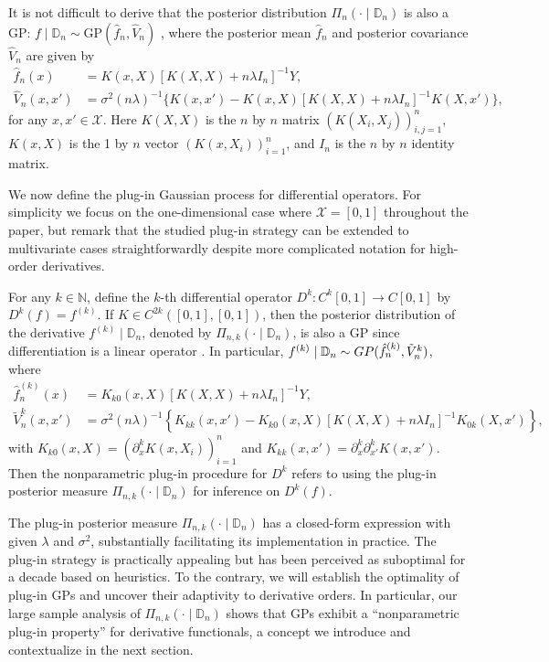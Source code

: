 \documentclass[12pt]{article}
\newcommand\data{\mathbb{D}_n}
\newcommand{\mX}{\mathcal{X}}
\newcommand{\GP}{\mathrm{GP}}
\theoremstyle{plain}
\theoremstyle{nonitalicremark}
\begin{document}
It is not difficult to derive that the posterior distribution $\Pi_n(\cdot\mid\data)$ is also a GP: $f \mid \data \sim \GP(\hat{f}_n, \hat{V}_n)$ \cite[Chapter~2.2]{rasmussen2006}, where the posterior mean $\hat{f}_n$ and posterior covariance $\hat{V}_n$ are given by
\begin{align}
\hat{f}_n(x) &= K(x, X) [K(X, X) + n \lambda I_n]^{-1} Y,\\
\label{eq:variance}\hat{V}_n(x, x') &=  \sigma^2 (n \lambda)^{-1} \{K(x, x') - K(x, X)[K(X, X) + n \lambda I_n]^{-1} K(X, x')\},
\end{align}
for any $x, x' \in \mX$. Here $K(X, X)$ is the $n$ by $n$ matrix $(K(X_i, X_j))_{i, j = 1}^n$, $K(x, X)$ is the 1 by $n$ vector $(K(x, X_i))_{i = 1}^n$, and $I_n$ is the $n$  by $n$ identity matrix. 

We now define the plug-in Gaussian process for differential operators. For simplicity we focus on the one-dimensional case where $\mX=[0,1]$ throughout the paper, but remark that the studied plug-in strategy can be extended to multivariate cases straightforwardly despite more complicated notation for high-order derivatives. 

For any $k\in\mathbb{N}$, define the $k$-th differential operator $D^k:C^k[0,1]\rightarrow C[0,1]$ by $D^k(f)=f^{(k)}$. If $K\in C^{2k}([0,1],[0,1])$, then the posterior distribution of the derivative $f^{(k)}\mid \data$, denoted by $\Pi_{n,k}(\cdot\mid\data)$, is also a GP since differentiation is a linear operator \cite[Chapters~4.1.1 and 9.4]{rasmussen2006}. In particular, $f^{(k)} \mid \data \sim {\rm GP}(\hat{f}^{(k)}_n, \tilde{V}^k_n)$, where
\begin{align}
\label{eq:f.hat.deriv}\hat{f}^{(k)}_n(x) &= K_{k0}(x, X) [K(X, X) + n \lambda I_n]^{-1} Y,\\
\label{eq:deriv.variance}\tilde{V}^k_n(x, x')&= \sigma^2 (n \lambda)^{-1} \left\{K_{kk}(x, x') -  K_{k0}(x, X)[K(X, X) + n \lambda I_n]^{-1} K_{0k}(X, x')\right\},
\end{align}
with $K_{k0}(x, X) = (\partial^k_x K(x, X_i))_{i = 1}^n$ and $K_{kk}(x, x')=\partial^{k}_x\partial^k_{x'}K(x,x')$. Then the nonparametric plug-in procedure for $D^k$ refers to using the plug-in posterior measure $\Pi_{n,k}(\cdot\mid\data)$ for inference on $D^k(f)$. 

The plug-in posterior measure $\Pi_{n,k}(\cdot\mid\data)$ has a closed-form expression with given $\lambda$ and $\sigma^2$, substantially facilitating its implementation in practice. The plug-in strategy is practically appealing but has been perceived as suboptimal for a decade \citep{stein2012interpolation,holsclaw2013gaussian} based on heuristics. To the contrary, we will establish the optimality of plug-in GPs and uncover their adaptivity to derivative orders. In particular, our large sample analysis of $\Pi_{n,k}(\cdot\mid\data)$ shows that GPs exhibit a ``nonparametric plug-in property'' for derivative functionals, a concept we introduce and contextualize in the next section.
\end{document}
